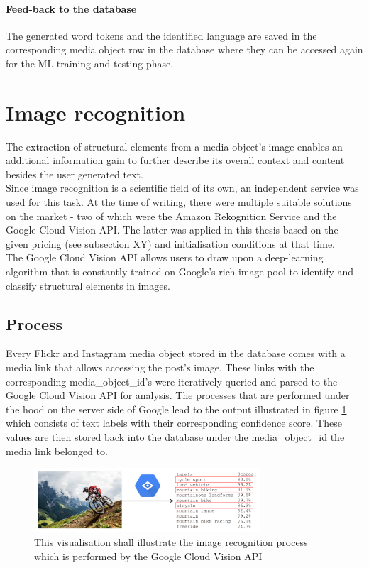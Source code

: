 \paragraph*{Feed-back to the database}
The generated word tokens and the identified language are saved in the corresponding media object row in the database where they can be accessed again for the ML training and testing phase.

\section{Image recognition} \label{image_recognition}
The extraction of structural elements from a media object's image enables an additional information gain to further describe its overall context and content besides the user generated text.\\
\newline
Since image recognition is a scientific field of its own, an independent service was used for this task. At the time of writing, there were multiple suitable solutions on the market - two of which were the Amazon Rekognition Service and the Google Cloud Vision API. The latter was applied in this thesis based on the given pricing (see subsection XY) and initialisation conditions at that time.\\
The Google Cloud Vision API allows users to draw upon a deep-learning algorithm that is constantly trained on Google's rich image pool to identify and classify structural elements in images.

\subsection{Process}
Every Flickr and Instagram media object stored in the database comes with a media link that allows accessing the post's image. 
These links with the corresponding media\_object\_id's were iteratively queried and parsed to the Google Cloud Vision API for analysis. The processes that are performed under the hood on the server side of Google lead to the output illustrated in figure \ref{fig:vision_illustration} which consists of text labels with their corresponding confidence score. These values are then stored back into the database under the media\_object\_id the media link belonged to.

\begin{figure}[h]
   \centering
   \includegraphics[width=0.75\textwidth]{img/vision_illustration}
   \caption{This visualisation shall illustrate the image recognition process which is performed by the Google Cloud Vision API \parencite{Allaboutlimassol2015}}
   \label{fig:vision_illustration}
\end{figure}

